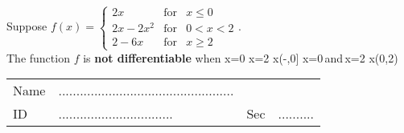 \documentclass[amsfonts,bezier,leqno,fleqn,12pt,a4paper]{article}
\begin{document}
{\begin{large}
\item %
Suppose $f(x)= \left\{\begin{array}{lll} 2x & \mbox{for} & x\leq 0 \\ \displaystyle 2x-2x^2 & \mbox{for} & 0 < x <2\\ 2-6x & \mbox{for} & x\geq 2 \end{array}\right.$.\\ The function $f$ is \textbf{not differentiable} when
\sc
\be
x=0
\ee
\be
x=2
\ee
\be
x\in(-\infty,0]
\ee
\be
x=0\,\mbox{and}\,x=2
\ee
\be
x\in(0,2)
\ee

\newpage



\en
\end{large}

\newpage


\renewcommand{\thepage}{\noindent Math 101, Final Exam, Term 162 \hfill Answer Sheet  \hfill {\bf \fbox{001}}}

\begin{Large}


\begin{tabular}{llll}
Name & .................................................& & \\
ID &   ................................& Sec & ..........\\
\end{tabular}

\vspace{10mm}



\end{Large}}
\end{document}
